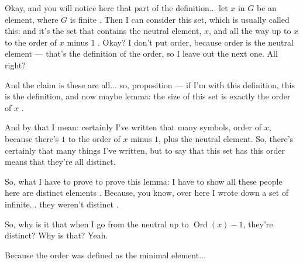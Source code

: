 \begin{speech}[01:24:34 - 01:26:26]
Okay, and you will notice here that part of the definition... let $x$ in $G$ be an element, where $G$ is finite . Then I can consider this set, which is usually called this: and it's the set that contains the neutral element, $x$, and all the way up to $x$ to the order of $x$ minus $1$ . Okay? I don't put order, because order is the neutral element --- that's the definition of the order, so I leave out the next one. All right?

And the claim is these are all... so, proposition --- if I'm with this definition, this is the definition, and now maybe lemma: the size of this set is exactly the order of $x$ .

And by that I mean: certainly I've written that many symbols, order of $x$, because there's $1$ to the order of $x$ minus $1$, plus the neutral element. So, there's certainly that many things I've written, but to say that this set has this order means that they're all distinct.

So, what I have to prove to prove this lemma: I have to show all these people here are distinct elements . Because, you know, over here I wrote down a set of infinite... they weren't distinct .

So, why is it that when I go from the neutral up to $\operatorname{Ord}(x) - 1$, they're distinct? Why is that? Yeah.
\end{speech}

\begin{student}
Because the order was defined as the minimal element... 
\end{student}

